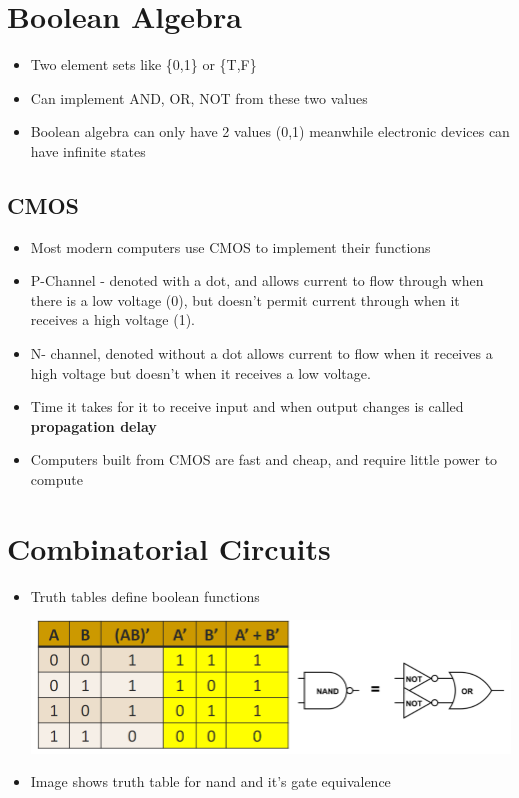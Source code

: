 \documentclass{article}
\begin{document}
\section{Boolean Algebra}

\begin{itemize}
    \item Two element sets like \{0,1\} or \{T,F\}
    
    \item Can implement AND, OR, NOT from these two values
    
    \item Boolean algebra can only have 2 values (0,1) meanwhile electronic devices can have infinite states
    
    
\end{itemize}

\subsection{CMOS}

\begin{itemize}
    \item Most modern computers use CMOS to implement their functions
    
    \item P-Channel - denoted with a dot, and allows current to flow through when there is a low voltage (0), but doesn't permit current through when it receives a high voltage (1).
    
    \item N- channel, denoted without a dot allows current to flow when it receives a high voltage but doesn't when it receives a low voltage.
    
    \item Time it takes for it to receive input and when output changes is called \textbf{propagation delay}
    
    \item Computers built from CMOS are fast and cheap, and require little power to compute
    
    \end{itemize}


\section{Combinatorial Circuits}

\begin{itemize}
    \item Truth tables define boolean functions
    
    \includegraphics[scale=0.35]{images/truthtable.png}
    \item Image shows truth table for nand and it's gate equivalence
    
    
\end{itemize}
\end{document}
